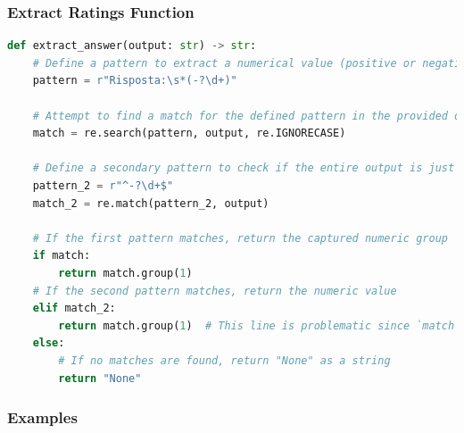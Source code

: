 \documentclass[10pt]{article}
\begin{document}
\subsubsection*{Extract Ratings Function}

\begin{lstlisting}[language=Python]
def extract_answer(output: str) -> str:
    # Define a pattern to extract a numerical value (positive or negative) after "Risposta:"
    pattern = r"Risposta:\s*(-?\d+)"

    # Attempt to find a match for the defined pattern in the provided output string
    match = re.search(pattern, output, re.IGNORECASE)

    # Define a secondary pattern to check if the entire output is just a number
    pattern_2 = r"^-?\d+$"
    match_2 = re.match(pattern_2, output)

    # If the first pattern matches, return the captured numeric group
    if match:
        return match.group(1)
    # If the second pattern matches, return the numeric value
    elif match_2:
        return match.group(1)  # This line is problematic since `match` would be None here
    else:
        # If no matches are found, return "None" as a string
        return "None"
\end{lstlisting}

\subsubsection*{Examples}
\end{document}
